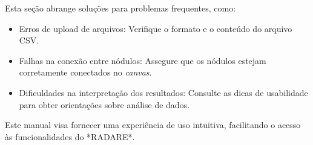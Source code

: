 Esta seção abrange soluções para problemas frequentes, como:
\begin{itemize}
    \item Erros de upload de arquivos: Verifique o formato e o conteúdo do arquivo CSV.
    \item Falhas na conexão entre nódulos: Assegure que os nódulos estejam corretamente conectados no \textit{canvas}.
    \item Dificuldades na interpretação dos resultados: Consulte as dicas de usabilidade para obter orientações sobre análise de dados.
\end{itemize}

Este manual visa fornecer uma experiência de uso intuitiva, facilitando o acesso às funcionalidades do *RADARE*.
